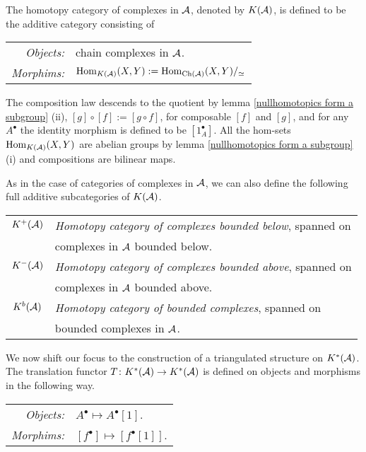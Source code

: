 The homotopy category of complexes in $\mathcal A$, denoted by $K(\mathcal A)$, is defined to be the additive category consisting of
\begin{center}
    \begin{tabular}{r l}
        \textsl{Objects:} & chain complexes in $\mathcal A$. \\
        \textsl{Morphims:} & $\operatorname{Hom}_{K(\mathcal A)}(X, Y) := \operatorname{Hom}_{\operatorname{Ch}(\mathcal A)}(X, Y)/_\simeq$
    \end{tabular}
\end{center}
The composition law descends to the quotient by lemma \ref{nullhomotopics form a subgroup} (ii), \ie $[g]\circ[f] := [g \circ f]$, for composable $[f]$ and $[g]$, and for any $A^\bullet$ the identity morphism is defined to be $[1_A^\bullet]$. All the hom-sets $\operatorname{Hom}_{K(\mathcal A)}(X, Y)$ are abelian groups by lemma \ref{nullhomotopics form a subgroup} (i) and compositions are bilinear maps. 

As in the case of categories of complexes in $\mathcal A$, we can also define the following full additive subcategories of $K(\mathcal A)$.
\begin{center}
    \begin{tabular}{c l}
        $K^+(\mathcal A)$ & \emph{Homotopy category of complexes bounded below}, spanned on \\ &complexes in $\mathcal A$ bounded below. \\
        $K^-(\mathcal A)$ & \emph{Homotopy category of complexes bounded above}, spanned on \\ &complexes in $\mathcal A$ bounded above. \\
        $K^b(\mathcal A)$ & \emph{Homotopy category of bounded complexes}, spanned on \\ &bounded complexes in $\mathcal A$. \\    
    \end{tabular}
\end{center}

We now shift our focus to the construction of a triangulated structure on $K^*(\mathcal A)$. The translation functor $T\colon K^*(\mathcal A) \to K^*(\mathcal A)$ is defined on objects and morphisms in the following way.
\begin{center}
    \begin{tabular}{r l}
        \textsl{Objects:} & $A^\bullet \longmapsto A^\bullet[1]$. \\
        \textsl{Morphims:} & $[f^\bullet] \longmapsto [f^\bullet[1]]$.
    \end{tabular}
\end{center}


